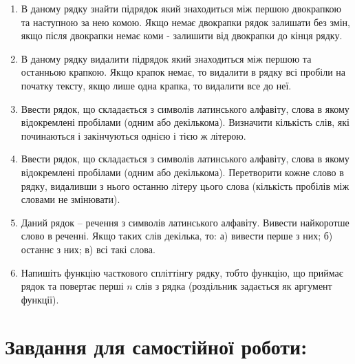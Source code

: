 \documentclass[a5paper,titlepage,openany,twoside,
]
{book_unv}%
\begin{document}
\begin{enumerate}
\begin{enumerate}
\def\labelenumi{\arabic{enumi})}
\item
  В даному рядку знайти підрядок який знаходиться між першою 
двокрапкою та наступною за нею комою. Якщо немає двокрапки
рядок залишати без змін, якщо після двокрапки немає коми - залишити від
двокрапки до кінця рядку.
\item
  В даному рядку видалити підрядок який знаходиться між першою 
та останньою крапкою. Якщо крапок немає, то видалити в рядку всі пробіли
на початку тексту, якщо лише одна крапка, то видалити все до неї.
\item
  Ввести рядок, що складається з символів латинського алфавіту, слова в якому
  відокремлені пробілами (одним або декількома). Визначити кількість слів,
  які починаються і закінчуються однією і тією ж літерою.
\item
  Ввести рядок, що складається з символів латинського алфавіту, слова в якому
  відокремлені пробілами (одним або декількома). Перетворити кожне слово в
  рядку, видаливши з нього останню літеру цього 
  слова (кількість пробілів між словами не змінювати).
\item
  Даний рядок -- речення з символів латинського алфавіту. Вивести
  найкоротше слово в реченні. Якщо таких слів декілька, то: 
  а) вивести перше з них; б) останнє з них; в) всі такі слова.
\item
  Напишіть функцію часткового спліттінгу рядку, тобто функцію, що
  приймає рядок та повертає перші $n$ слів з рядка (роздільник задається
  як аргумент функції).
\end{enumerate}

\section{Завдання для самостійної роботи:}


\end{enumerate}
\end{document}
